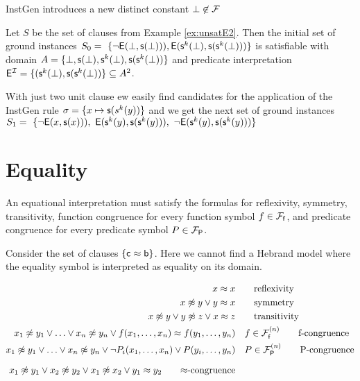 InstGen introduces a new distinct constant $\bot\not\in{\mathcal F}$

\begin{example}\label{ex:unsat2}
Let $S$ be the set of clauses from Example \ref{ex:unsatE2}. 
Then the initial set of ground instances 
$S_0 =\
\{
{ \lnot{\mathsf{E}}(\bot, {\mathsf s}(\bot)))}, 
{ {\mathsf{E}}({\mathsf s}^k(\bot), {\mathsf s}({\mathsf s}^k(\bot)))}
\}$
is satisfiable with domain $A = \{ \bot, {\mathsf s}(\bot), {\mathsf s}^k(\bot), {\mathsf s}({\mathsf s}^k(\bot)) \}$
and predicate interpretation 
${\mathsf{E}}^{\mathcal I} = \{ ({\mathsf s}^k(\bot), {\mathsf s}({\mathsf s}^k(\bot))
 \} \subseteq A^2$. 
 
 With just two unit clause ew easily find candidates for the application of the InstGen rule 
 $\sigma = \{ x\mapsto {\mathsf s}(s^k(y)) \}$ and we get the next set of ground instances
$S_1 =\
 \{
 { \lnot{\mathsf{E}}(x, {\mathsf s}(x)))},\  
 { {\mathsf{E}}({\mathsf s}^k(y), {\mathsf s}({\mathsf s}^k(y)))},\
 { \lnot{\mathsf{E}}({\mathsf s}^k(y), {\mathsf s}({\mathsf s}^k(y)))}
 \}$
\end{example}




\section{Equality}



	An equational interpretation must satisfy the formulas for reflexivity, symmetry, transitivity, 
	function congruence for every function symbol $f\in{{\mathcal F}_{\mathsf f}}$, 
	and predicate congruence for every predicate symbol $P\in{{\mathcal F}_{\mathsf P}}$.

%

\begin{example}
	Consider the set of clauses $\{ {\mathsf c} \approx {\mathsf b} \}$. Here we cannot find a Hebrand model where the equality symbol is interpreted as equality on its domain.
\end{example}

\begin{align*}
	 x \mEQ x & \tag*{reflexivity} \\
	x \mNE y \lor y \mEQ x & \tag*{symmetry}\\
	x\mNE y\lor y\mNE z\lor x\mEQ z & \tag*{transitivity} \\
	x_1 \mNE y_1\lor\ldots\lor x_n \mNE y_n\lor f(x_1,\ldots,x_n)\mEQ f(y_1,\ldots,y_n) &\quad f\in\mcFfn
	\tag*{f-congruence}
	\\
	x_1\mNE y_1\lor\ldots\lor x_n\mNE y_n\lor\lnot P_i(x_1,\ldots,x_n)\lor P(y_i,\ldots,y_n) &\quad P\in\mcFPn
	\tag*{P-congruence}
	\\[0.7em]
	x_1\mNE y_1\lor x_2\mNE y_2
	\lor x_1\mNE x_2
	\lor y_1\mEQ y_2
	\tag*{$\mEQ$-congruence}
\end{align*}

